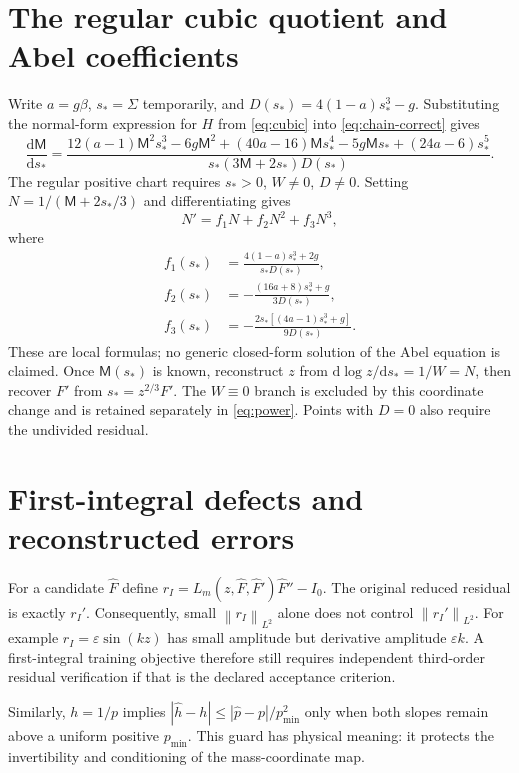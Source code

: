 \documentclass[11pt,a4paper,oneside]{report}
\numberwithin{equation}{chapter}
\newcommand{\dd}{\mathrm d}
\newcommand{\norm}[1]{\left\lVert#1\right\rVert}
\begin{document}
\section{The regular cubic quotient and Abel coefficients}
Write $a=g\beta$, $s_*=\Sigma$ temporarily, and
$D(s_*)=4(1-a)s_*^3-g$. Substituting the normal-form expression for $H$ from \eqref{eq:cubic} into \eqref{eq:chain-correct} gives
\begin{equation}\label{eq:quotient-explicit}
\frac{\dd\mathsf M}{\dd s_*}=
\frac{12(a-1)\mathsf M^2s_*^3-6g\mathsf M^2
 +(40a-16)\mathsf M s_*^4-5g\mathsf M s_*
 +(24a-6)s_*^5}{s_*(3\mathsf M+2s_*)D(s_*)}.
\end{equation}
The regular positive chart requires $s_*>0$, $W\ne0$, $D\ne0$. Setting $N=1/(\mathsf M+2s_*/3)$ and differentiating gives
\begin{equation}
N'=f_1N+f_2N^2+f_3N^3,
\end{equation}
where
\begin{align}
f_1(s_*)&=\frac{4(1-a)s_*^3+2g}{s_*D(s_*)},\\
f_2(s_*)&=-\frac{(16a+8)s_*^3+g}{3D(s_*)},\\
f_3(s_*)&=-\frac{2s_*[(4a-1)s_*^3+g]}{9D(s_*)}.
\end{align}
These are local formulas; no generic closed-form solution of the Abel equation is claimed. Once $\mathsf M(s_*)$ is known, reconstruct $z$ from
$\dd\log z/\dd s_*=1/W=N$, then recover $F'$ from $s_*=z^{2/3}F'$. The $W\equiv0$ branch is excluded by this coordinate change and is retained separately in \eqref{eq:power}. Points with $D=0$ also require the undivided residual.

\section{First-integral defects and reconstructed errors}
For a candidate $\widehat F$ define $r_I=L_m(z,\widehat F,\widehat F')\widehat F''-I_0$. The original reduced residual is exactly $r_I'$. Consequently, small $\norm{r_I}_{L^2}$ alone does not control $\norm{r_I'}_{L^2}$. For example $r_I=\varepsilon\sin(kz)$ has small amplitude but derivative amplitude $\varepsilon k$. A first-integral training objective therefore still requires independent third-order residual verification if that is the declared acceptance criterion.

Similarly, $h=1/p$ implies
$|\widehat h-h|\le|\widehat p-p|/p_{\min}^2$ only when both slopes remain above a uniform positive $p_{\min}$. This guard has physical meaning: it protects the invertibility and conditioning of the mass-coordinate map.
\end{document}
